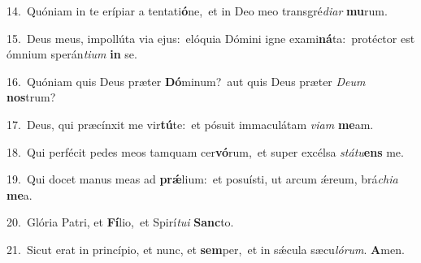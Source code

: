{\numbfont\textcolor{\numbcolor}{14.}}~Quóniam in te erípiar a tentati\-\textbf{ó}\-ne,~\star et in Deo meo transgré\-\textit{di}\-\textit{ar} \textbf{mu}\-rum.\par
{\numbfont\textcolor{\numbcolor}{15.}}~Deus meus, impollúta via ejus:~\dagger elóquia Dómini igne exami\-\textbf{ná}\-ta:~\star protéctor est ómnium sperán\-\textit{ti}\-\textit{um} \textbf{in} se.\par
{\numbfont\textcolor{\numbcolor}{16.}}~Quóniam quis Deus præter \textbf{Dó}\-minum?~\star aut quis Deus præter \textit{De}\-\textit{um} \textbf{nos}\-trum?\par
{\numbfont\textcolor{\numbcolor}{17.}}~Deus, qui præcínxit me vir\-\textbf{tú}\-te:~\star et pósuit immaculátam \textit{vi}\-\textit{am} \textbf{me}\-am.\par
{\numbfont\textcolor{\numbcolor}{18.}}~Qui perfécit pedes meos tamquam cer\-\textbf{vó}\-rum,~\star et super excélsa \textit{stá}\-\textit{tu}\textbf{ens} me.\par
{\numbfont\textcolor{\numbcolor}{19.}}~Qui docet manus meas ad \textbf{prǽ}\-lium:~\star et posuísti, ut arcum ǽreum, brá\-\textit{chi}\-\textit{a} \textbf{me}\-a.\par
{\numbfont\textcolor{\numbcolor}{20.}}~Glória Patri, et \textbf{Fí}\-lio,~\star et Spirí\-\textit{tu}\-\textit{i} \textbf{Sanc}\-to.\par
{\numbfont\textcolor{\numbcolor}{21.}}~Sicut erat in princípio, et nunc, et \textbf{sem}\-per,~\star et in sǽcula sæcu\-\textit{ló}\-\textit{rum}. \textbf{A}\-men.\par
